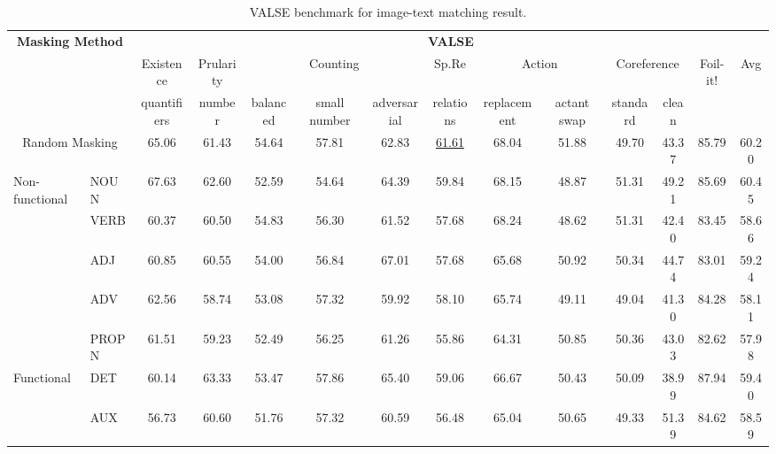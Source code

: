 \begin{table}[H]
    \centering
    \caption{VALSE benchmark for image-text matching result.}
    \label{tab:valse}
    \begin{adjustbox}{width=1\textwidth}
        \begin{tabular}{ll|c|c|ccc|c|cc|cc|c|c}
            \hline
            \multicolumn{2}{c|}{\multirow{3}{*}{\textbf{Masking Method}}} & \multicolumn{12}{c}{\textbf{VALSE}} \\
            & & Existence & Prularity & \multicolumn{3}{c|}{Counting} & Sp.Re \footnotemark & \multicolumn{2}{c|}{Action} & \multicolumn{2}{c|}{Coreference} & \multirow{2}{*}{Foil-it!} & \multirow{2}{*}{Avg} \\
            & & quantifiers & number & balanced & small number & adversarial & relations & replacement & actant swap & standard & clean & & \\
            \hline
            \multicolumn{2}{c|}{Random Masking} & 65.06 & 61.43 & 54.64 & 57.81 & 62.83 & \underline{61.61} & 68.04 & 51.88 & 49.70 & 43.37 & 85.79 & 60.20 \\
            \hline
            \multirow{5}{*}{Non-functional} & NOUN & \cellcolor{gray}67.63 & \cellcolor{lightgray}62.60 & 52.59 & 54.64 & \cellcolor{lightgray}64.39 & \cellcolor{gray}59.84 & \cellcolor{lightgray}68.15 & 48.87 & \cellcolor{lightgray}51.31 & 49.21 & 85.69 & \cellcolor{gray}60.45 \\
            & VERB & 60.37 & 60.50 & \cellcolor{gray}54.83 & 56.30 & 61.52 & 57.68 & \cellcolor{gray}68.24 & 48.62 & \cellcolor{lightgray}51.31 & 42.40 & 83.45 & 58.66 \\
            & ADJ & 60.85 & 60.55 & \cellcolor{lightgray}54.00 & 56.84 & \cellcolor{gray}67.01 & 57.68 & 65.68 & \cellcolor{lightgray}50.92 & 50.34 & 44.74 & 83.01 & 59.24 \\
            & ADV & 62.56 & 58.74 & 53.08 & \cellcolor{lightgray}57.32 & 59.92 & 58.10 & 65.74 & 49.11 & 49.04 & 41.30 & 84.28 & 58.11 \\
            & PROPN & 61.51 & 59.23 & 52.49 & 56.25 & 61.26 & 55.86 & 64.31 & 50.85 & 50.36 & 43.03 & 82.62 & 57.98 \\
            \hline
            \multirow{4}{*}{Functional} & DET & 60.14 & \cellcolor{gray}63.33 & 53.47 & \cellcolor{gray}57.86 & 65.40 & \cellcolor{lightgray}59.06 & 66.67 & 50.43 & 50.09 & 38.99 & \cellcolor{gray}87.94 & 59.40 \\
            & AUX & 56.73 & 60.60 & 51.76 & \cellcolor{lightgray}57.32 & 60.59 & 56.48 & 65.04 & 50.65 & 49.33 & \cellcolor{gray}51.39 & 84.62 & 58.59 \\

\end{tabular}
\end{adjustbox}
\end{table}
